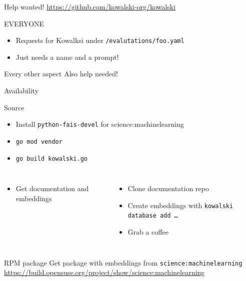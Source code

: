 \documentclass[aspectratio=169]{beamer}
\begin{document}
\begin{frame}{Help wanted!}
\href{https://github.com/kowalski-org/kowalski}{https://github.com/kowalski-org/kowalski}
\begin{block}{EVERYONE}
\begin{itemize}
  \item Requests for Kowalksi under \texttt{/evalutations/foo.yaml}
  \item Just needs a name and a prompt!
\end{itemize}
\end{block}
\begin{block}{Every other aspect}
Also help needed!
\end{block}
\end{frame}

\begin{frame}{Availability}
\begin{block}{Source}
\begin{itemize}
  \item Install \texttt{python-fais-devel} for {science:machinelearning}
  \item \texttt{go mod vendor}
  \item \texttt{go build kowalski.go}
\end{itemize}
\begin{columns}
\begin{itemize}
  \item Get documentation and embeddings
\end{itemize}
\begin{itemize}
  \item Clone documentation repo
  \item Create embeddings with \texttt{kowalski database add \dots}
  \item Grab a coffee
\end{itemize}
\end{columns}
\end{block}
\begin{block}{RPM package}
  Get package with embeddings from \texttt{science:machinelearning}\\
  \href{https://build.opensuse.org/project/show/science:machinelearning}{https://build.opensuse.org/project/show/science:machinelearning}
\end{block}
\end{frame}
\end{document}
